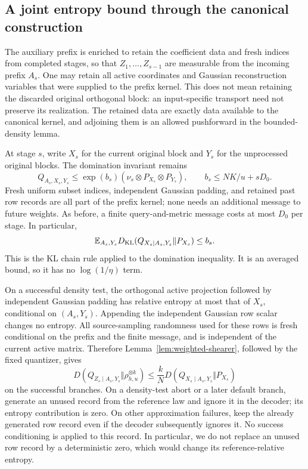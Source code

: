 \subsection{A joint entropy bound through the canonical construction}

The auxiliary prefix is enriched to retain the coefficient data and
fresh indices from completed stages, so that $Z_1,\ldots,Z_{s-1}$ are
measurable from the incoming prefix $A_s$. One may retain all active
coordinates and Gaussian reconstruction variables that were supplied to
the prefix kernel. This does not mean retaining the discarded original
orthogonal block: an input-specific transport need not preserve its
realization. The retained data are exactly data available to the canonical
kernel, and adjoining them is an allowed pushforward in the bounded-density
lemma.

At stage $s$, write $X_s$ for the current original block and $Y_s$ for
the unprocessed original blocks. The domination invariant remains
\[
 Q_{A_s,X_s,Y_s}\le \exp(b_s)
           (\nu_s\otimes P_{X_s}\otimes P_{Y_s}),\qquad
 b_s\le NK/u+sD_0.
\]
Fresh uniform subset indices, independent Gaussian padding, and retained
past row records are all part of the prefix kernel; none needs an
additional message to future weights. As before, a finite query-and-metric
message costs at most $D_0$ per stage. In particular,
\begin{equation}\label{eq:weighted-average-block}
 \mathbb E_{A_s,Y_s}
 D_{\rm KL}(Q_{X_s\mid A_s,Y_s}\Vert P_{X_s})\le b_s.
\end{equation}
This is the KL chain rule applied to the domination inequality. It is
an averaged bound, so it has no $\log(1/\eta)$ term.

On a successful density test, the orthogonal active projection followed
by independent Gaussian padding has relative entropy at most that of
$X_s$, conditional on $(A_s,Y_s)$. Appending the independent Gaussian
row scalar changes no entropy. All source-sampling randomness used for
these rows is fresh conditional on the prefix and the finite message,
and is independent of the current active matrix. Therefore
Lemma~\ref{lem:weighted-shearer}, followed by the fixed quantizer, gives
\[
 D(Q_{Z_s\mid A_s,Y_s}\Vert\rho_{h,u}^{\otimes k})
 \le \frac{k}{N}
       D(Q_{X_s\mid A_s,Y_s}\Vert P_{X_s})
\]
on the successful branches. On a density-test abort or a later default
branch, generate an unused record from the reference law and ignore it
in the decoder; its entropy contribution is zero. On other approximation failures, keep the already generated row record
even if the decoder subsequently ignores it. No success conditioning
is applied to this record. In particular,
we do not replace an unused row record by a deterministic zero, which
would change its reference-relative entropy.

